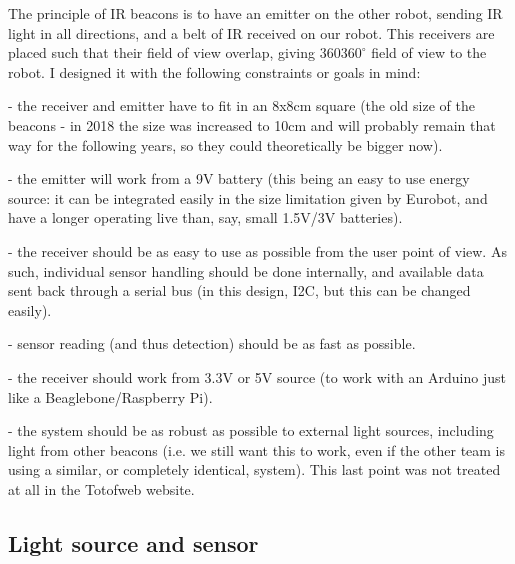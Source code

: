 \documentclass[a4paper,11pt]{article}
\begin{document}
The principle of IR beacons is to have an emitter on the other robot, sending IR light in all directions, and a belt of IR received on our robot. This receivers are placed such that their field of view overlap, giving 360$360^\circ$ field of view to the robot. I designed it with the following constraints or goals in mind:

 - the receiver and emitter have to fit in an 8x8cm square (the old size of the beacons - in 2018 the size was increased to 10cm and will probably remain that way for the following years, so they could theoretically be bigger now).

 - the emitter will work from a 9V battery (this being an easy to use energy source: it can be integrated easily in the size limitation given by Eurobot, and have a longer operating live than, say, small 1.5V/3V batteries).

 - the receiver should be as easy to use as possible from the user point of view. As such, individual sensor handling should be done internally, and available data sent back through a serial bus (in this design, I2C, but this can be changed easily).

 - sensor reading (and thus detection) should be as fast as possible.

 - the receiver should work from 3.3V or 5V source (to work with an Arduino just like a Beaglebone/Raspberry Pi).

 - the system should be as robust as possible to external light sources, including light from other beacons (i.e. we still want this to work, even if the other team is using a similar, or completely identical, system). This last point was not treated at all in the Totofweb website.

 \subsection{Light source and sensor}
\end{document}
